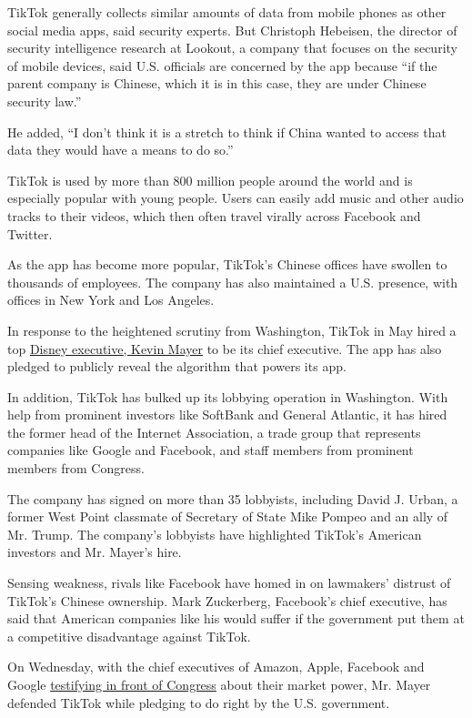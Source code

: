 TikTok generally collects similar amounts of data from mobile phones as
other social media apps, said security experts. But Christoph Hebeisen,
the director of security intelligence research at Lookout, a company
that focuses on the security of mobile devices, said U.S. officials are
concerned by the app because ``if the parent company is Chinese, which
it is in this case, they are under Chinese security law.''

He added, ``I don't think it is a stretch to think if China wanted to
access that data they would have a means to do so.''

TikTok is used by more than 800 million people around the world and is
especially popular with young people. Users can easily add music and
other audio tracks to their videos, which then often travel virally
across Facebook and Twitter.

As the app has become more popular, TikTok's Chinese offices have
swollen to thousands of employees. The company has also maintained a
U.S. presence, with offices in New York and Los Angeles.

In response to the heightened scrutiny from Washington, TikTok in May
hired a top
\href{https://www.nytimes.com/2020/05/18/business/media/tiktok-ceo-kevin-mayer.html}{Disney
executive, Kevin Mayer} to be its chief executive. The app has also
pledged to publicly reveal the algorithm that powers its app.

In addition, TikTok has bulked up its lobbying operation in Washington.
With help from prominent investors like SoftBank and General Atlantic,
it has hired the former head of the Internet Association, a trade group
that represents companies like Google and Facebook, and staff members
from prominent members from Congress.

The company has signed on more than 35 lobbyists, including David J.
Urban, a former West Point classmate of Secretary of State Mike Pompeo
and an ally of Mr. Trump. The company's lobbyists have highlighted
TikTok's American investors and Mr. Mayer's hire.

Sensing weakness, rivals like Facebook have homed in on lawmakers'
distrust of TikTok's Chinese ownership. Mark Zuckerberg, Facebook's
chief executive, has said that American companies like his would suffer
if the government put them at a competitive disadvantage against TikTok.

On Wednesday, with the chief executives of Amazon, Apple, Facebook and
Google
\href{https://www.nytimes.com/2020/07/29/technology/big-tech-hearing-apple-amazon-facebook-google.html}{testifying
in front of Congress} about their market power, Mr. Mayer defended
TikTok while pledging to do right by the U.S. government.

